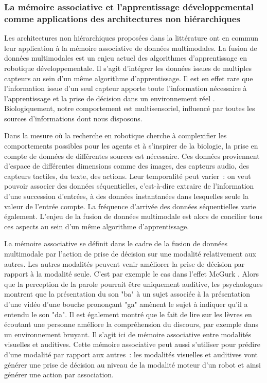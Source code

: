 \documentclass[../main]{subfiles}
\begin{document}
\subsubsection{La mémoire associative et l'apprentissage développemental comme applications des architectures non hiérarchiques}

Les architectures non hiérarchiques proposées dans la littérature ont en commun leur application à la mémoire associative de données multimodales.
La fusion de données multimodales est un enjeu actuel des algorithmes d'apprentissage en robotique développementale.
Il s'agit d'intégrer les données issues de multiples capteurs au sein d'un même algorithme d'apprentissage.
Il est en effet rare que l'information issue d'un seul capteur apporte toute l'information nécessaire à l'apprentissage et la prise de décision dans un environnement réel \cite{lahat2015}. Biologiquement, notre comportement est multisensoriel, influencé par toutes les sources d'informations dont nous disposons.

Dans la mesure où la recherche en robotique cherche à complexifier les comportements possibles pour les agents et à s'inspirer de la biologie, la prise en compte de données de différentes sources est nécessaire. Ces données proviennent d'espace de différentes dimensions comme des images, des capteurs audio, des capteurs tactiles, du texte, des actions. Leur temporalité peut varier~: on veut pouvoir associer des données séquentielles, c'est-à-dire extraire de l'information d'une succession d'entrées, à des données instantanées dans lesquelles seule la valeur de l'entrée compte. La fréquence d'arrivée des données séquentielles varie également.
L'enjeu de la fusion de données multimodale est alors de concilier tous ces aspects au sein d'un même algorithme d'apprentissage.

La mémoire associative se définit dans le cadre de la fusion de données multimodale par l'action de prise de décision sur une modalité relativement aux autres.
Les autres modalités peuvent venir améliorer la prise de décision par rapport à la modalité seule. C'est par exemple le cas dans l'effet McGurk \cite{McGurk1976HearingLA}. Alors que la perception de la parole pourrait être uniquement auditive, les psychologues montrent que la présentation du son "ba" à un sujet associée à la présentation d'une vidéo d'une bouche prononçant "ga" amènent le sujet à indiquer qu'il a entendu le son "da". Il est également montré que le fait de lire sur les lèvres en écoutant une personne améliore la compréhension du discours, par exemple dans un environnement bruyant. Il s'agit ici de mémoire associative entre modalités visuelles et auditives.
Cette mémoire associative peut aussi s'utiliser pour prédire d'une modalité par rapport aux autres~: les modalités visuelles et auditives vont générer une prise de décision au niveau de la modalité moteur d'un robot et ainsi générer une action par association.
\end{document}
